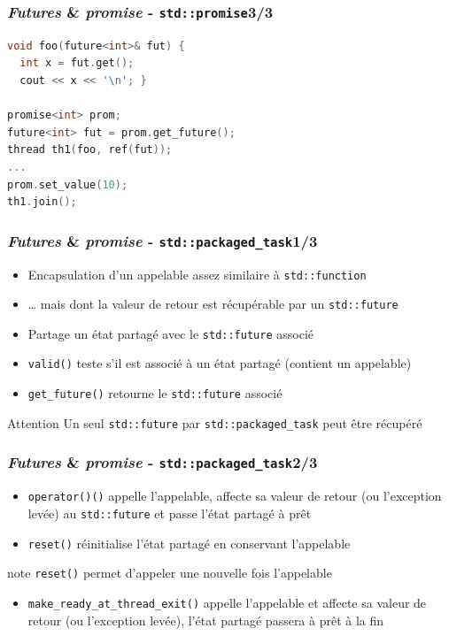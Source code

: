 \documentclass[C++.tex]{subfiles}
\begin{document}
\begin{frame}[fragile]
	\frametitle{\textit{Futures} \& \textit{promise} - \lstinline|std::promise|\titlehfill{}3/3}
	\begin{lstlisting}[language=C++]
void foo(future<int>& fut) {
  int x = fut.get();
  cout << x << '\n'; }

promise<int> prom;
future<int> fut = prom.get_future();
thread th1(foo, ref(fut));
...
prom.set_value(10);
th1.join();\end{lstlisting}
\end{frame}

\begin{frame}[fragile]
	\frametitle{\textit{Futures} \& \textit{promise} - \lstinline|std::packaged_task|\titlehfill{}1/3}
	\begin{itemize}
		\item Encapsulation d'un appelable assez similaire à \lstinline|std::function|
		\item \ldots{} mais dont la valeur de retour est récupérable par un \lstinline|std::future|
		\item Partage un état partagé avec le \lstinline|std::future| associé
		\item \lstinline|valid()| teste s'il est associé à un état partagé (contient un appelable)
		\item \lstinline|get_future()| retourne le \lstinline|std::future| associé
	\end{itemize}

	\begin{alertblock}{Attention}
		Un seul \lstinline|std::future| par \lstinline|std::packaged_task| peut être récupéré
	\end{alertblock}
\end{frame}

\begin{frame}[fragile]
	\frametitle{\textit{Futures} \& \textit{promise} - \lstinline|std::packaged_task|\titlehfill{}2/3}
	\begin{itemize}
		\item \lstinline|operator()()| appelle l'appelable, affecte sa valeur de retour (ou l'exception levée) au \lstinline|std::future| et passe l'état partagé à prêt
		\item \lstinline|reset()| réinitialise l'état partagé en conservant l'appelable
	\end{itemize}

	\begin{block}{note}
		\lstinline|reset()| permet d'appeler une nouvelle fois l'appelable
	\end{block}

	\begin{itemize}
		\item \lstinline|make_ready_at_thread_exit()| appelle l'appelable et affecte sa valeur de retour (ou l'exception levée), l'état partagé passera à prêt à la fin
	\end{itemize}
\end{frame}
\end{document}
